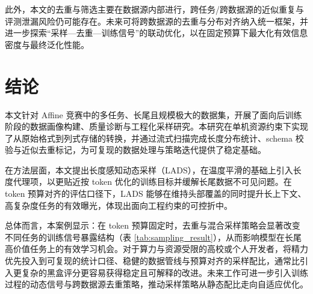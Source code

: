 \documentclass[UTF8]{article}
\begin{document}
此外，本文的去重与筛选主要在数据源内部进行，跨任务/跨数据源的近似重复与评测泄漏风险仍可能存在。未来可将跨数据源的去重与分布对齐纳入统一框架，并进一步探索“采样—去重—训练信号”的联动优化，以在固定预算下最大化有效信息密度与最终泛化性能。

\section{结论}\label{sec:conclusion}
本文针对 Affine 竞赛中的多任务、长尾且规模极大的数据集，开展了面向后训练阶段的数据画像构建、质量诊断与工程化采样研究。本研究在单机资源约束下实现了从原始格式到列式存储的转换，并通过流式扫描完成长度分布统计、schema 校验与近似去重标记，为可复现的数据处理与策略迭代提供了稳定基础。

在方法层面，本文提出长度感知动态采样（LADS），在温度平滑的基础上引入长度代理项，以更贴近按 token 优化的训练目标并缓解长尾数据不可见问题。在 token 预算对齐的评估口径下，LADS 能够在维持头部覆盖的同时提升长上下文、高复杂度任务的有效曝光，体现出面向工程约束的可控折中。

总体而言，本案例显示：在 token 预算固定时，去重与混合采样策略会显著改变不同任务的训练信号暴露结构（表 \ref{tab:sampling_result}），从而影响模型在长尾高价值任务上的有效学习机会。对于算力与资源受限的高校或个人开发者，将精力优先投入到可复现的统计口径、稳健的数据管线与预算对齐的采样配比，通常比引入更复杂的黑盒评分更容易获得稳定且可解释的改进。未来工作可进一步引入训练过程的动态信号与跨数据源去重策略，推动采样策略从静态配比走向自适应优化。



\newpage
\nocite{*}


\end{document}
